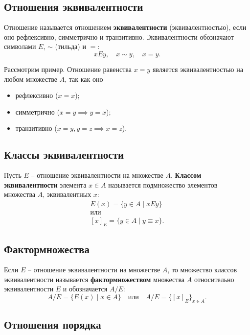 \documentclass[a5paper, 11pt]{extarticle}
\theoremstyle{definition}
\theoremstyle{definition}
\theoremstyle{definition}
\numberwithin{figure}{section}
\numberwithin{table}{section}
\begin{document}
\subsection{Отношения эквивалентности}

Отношение называется отношением \textbf{эквивалентности} (эквивалентностью), если оно рефлексивно, симметрично и транзитивно. Эквивалентности обозначают символами \(E\), \(\sim\) (тильда) и \(=\):
\[
    xEy,
    \quad
    x \sim y,
    \quad
    x = y.
\]

Рассмотрим пример. Отношение равенства \(x = y\) является эквивалентностью на любом множестве \(A\), так как оно
\begin{itemize}
    \item рефлексивно (\(x = x\));
    \item симметрично (\(x = y \implies y = x\));
    \item транзитивно (\(x = y, y = z \implies x = z\)).
\end{itemize}

\subsection{Классы эквивалентности}

Пусть \(E\) -- отношение эквивалентности на множестве \(A\). \textbf{Классом эквивалентности} элемента \(x \in A\) называется подмножество элементов множества \(A\), эквивалентных \(x\):
\begin{gather*}
    E(x) = \{y \in A \mid xEy\}
    \\ \text{или} \\
    [x]_E = \{y \in A \mid y \equiv x\}.
\end{gather*}

\subsection{Фактормножества}

Если \(E\) -- отношение эквивалентности на множестве \(A\), то множество классов эквивалентности называется \textbf{фактормножеством} множества \(A\) относительно эквивалентности \(E\) и обозначается \(A \slash E\):
\[
    A \slash E = \{E(x) \mid x \in A\}
    \quad
    \text{или}
    \quad
    A \slash E = \{[x]_E\}_{x \in A}.
\]

\subsection{Отношения порядка}
\end{document}
